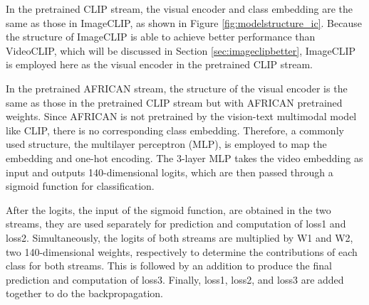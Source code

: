 In the pretrained CLIP stream, the visual encoder and class embedding are the same as those in ImageCLIP, as shown in Figure \ref{fig:modelstructure_ic}. Because the structure of ImageCLIP is able to achieve better performance than VideoCLIP, which will be discussed in Section \ref{sec:imageclipbetter}, ImageCLIP is employed here as the visual encoder in the pretrained CLIP stream. 

In the pretrained AFRICAN stream, the structure of the visual encoder is the same as those in the pretrained CLIP stream but with AFRICAN pretrained weights. Since AFRICAN is not pretrained by the vision-text multimodal model like CLIP, there is no corresponding class embedding. Therefore, a commonly used structure, the multilayer perceptron (MLP), is employed to map the embedding and one-hot encoding. The 3-layer MLP takes the video embedding as input and outputs 140-dimensional logits, which are then passed through a sigmoid function for classification.

After the logits, the input of the sigmoid function, are obtained in the two streams, they are used separately for prediction and computation of loss1 and loss2. Simultaneously, the logits of both streams are multiplied by W1 and W2, two 140-dimensional weights, respectively to determine the contributions of each class for both streams. This is followed by an addition to produce the final prediction and computation of loss3. Finally, loss1, loss2, and loss3 are added together to do the backpropagation. 
